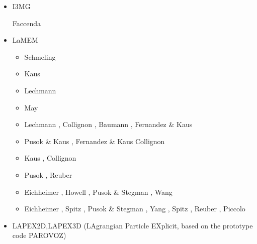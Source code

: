 \begin{itemize}
\item I3MG


\begin{scriptsize}
\twothousandfourteen Faccenda \cite{facc14}
\end{scriptsize}


\item LaMEM 

\begin{scriptsize}
\begin{itemize}
\item[\twothousandeight] Schmeling \etal \cite{scbe08}
\item[\twothousandten] Kaus \etal \cite{kamm10}
\item[\twothousandeleven] Lechmann \etal \cite{lemk11}
\item[\twothousandtwelve] May \cite{may12}
\item[\twothousandfourteen] Lechmann \etal \cite{lesh14}, Collignon \etal \cite{cokm14}, 
                            Baumann \etal \cite{bakp14}, 
                            Fernandez \& Kaus \cite{feka14a,feka14b}
\item[\twothousandfifteen] Pusok \& Kaus \cite{puka15}, Fernandez \& Kaus \cite{feka15}
                           Collignon \etal \cite{cofk15}
\item[\twothousandsixteen] Kaus \etal \cite{kapb16}, Collignon \etal \cite{coyc16}
\item[\twothousandeighteen] Pusok \etal \cite{pukp18}, Reuber \etal \cite{rekp18,repk18}
\item[\twothousandnineteen] Eichheimer \etal \cite{eitp19}, Howell \etal \cite{hooi19}, 
                            Pusok \& Stegman \cite{pust19}, Wang \etal \cite{wakz19}
\item[\twothousandtwenty] Eichheimer \etal \cite{eitf20}, Spitz \etal \cite{spsk20}, 
                          Pusok \& Stegman \cite{pust20}, Yang \etal \cite{yakl20}, 
                          Spitz \etal \cite{spbe20}, Reuber \etal \cite{rehp20},
                          Piccolo \etal \cite{pikw20}
\end{itemize}
\end{scriptsize}

\item LAPEX2D,LAPEX3D  (LAgrangian Particle EXplicit, based on the prototype code PAROVOZ) 


\end{itemize}
